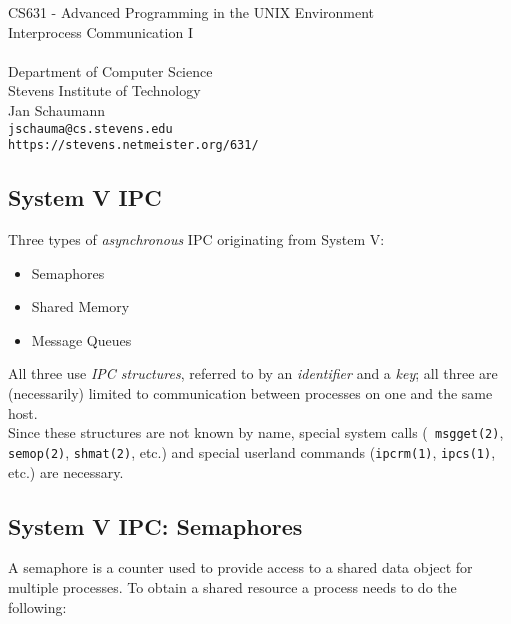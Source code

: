 \documentclass[xga]{xdvislides}
\begin{document}
\setfontphv

\lhead{\slidetitle}
\cfoot{\relax}
\rfoot{\Gray{\today}}

\vspace*{\fill}
\begin{center}
	\Hugesize
		CS631 - Advanced Programming in the UNIX Environment\\
		Interprocess Communication I\\
	\hspace*{5mm}\blueline\\ [1em]

	\Normalsize
		Department of Computer Science\\
		Stevens Institute of Technology\\
		Jan Schaumann\\
		\verb+jschauma@cs.stevens.edu+\\
		\verb+https://stevens.netmeister.org/631/+
\end{center}
\vspace*{\fill}

\subsection{System V IPC}
Three types of {\em asynchronous} IPC originating from System V:
\begin{itemize}
	\item Semaphores
	\item Shared Memory
	\item Message Queues
\end{itemize}
\vspace{.5in}

All three use {\em IPC structures}, referred to by an {\em identifier} and a
{\em key}; all three are (necessarily) limited to communication between
processes on one and the same host.
\\

Since these structures are not known by name, special system calls ({\tt
msgget(2)}, {\tt semop(2)}, {\tt shmat(2)}, etc.) and special userland
commands ({\tt ipcrm(1)}, {\tt ipcs(1)}, etc.) are necessary.


\subsection{System V IPC: Semaphores}
A semaphore is a counter used to provide access to a shared data object for
multiple processes.  To obtain a shared resource a process needs to do the
following: \\
\end{document}
